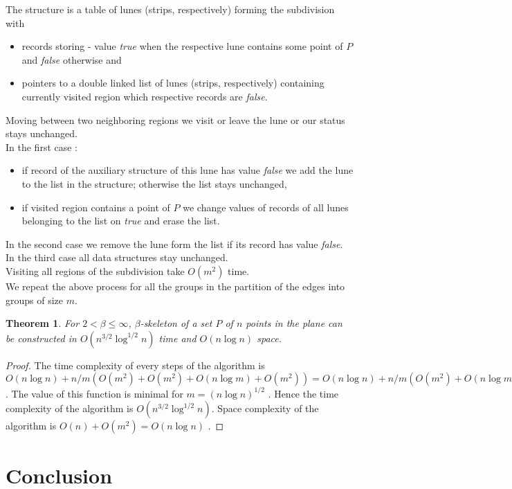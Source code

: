 \documentclass[10pt]{article}
\newtheorem{theorem}{\textbf{Theorem}}[section]
\begin{document}
The structure is a table of lunes (strips, respectively) forming the subdivision with 
\begin{itemize}
\item
records storing - value {\em true} when the respective lune contains some point of $P$ and {\em false} 
otherwise and
\item
pointers to a double linked list of lunes (strips, respectively) containing currently visited region which 
respective records are {\em false}.
\end{itemize}
Moving between two neighboring regions we visit or leave the lune or our status stays unchanged. \\
In the first case : 
\begin{itemize}
\item
if record of the auxiliary structure of this lune has value {\em false} we add the lune to the list 
in the structure; 
otherwise the list stays unchanged, 
\item 
if visited region contains a point of $P$ we change values of records of all lunes belonging to the list 
on {\em true} and erase the list.
\end{itemize}
In the second case we remove the lune form the list if its record has value {\em false}. \\
In the third case all data structures stay unchanged. \\
Visiting all regions of the subdivision take $O(m^2)$ time. \\
We repeat the above process for all the groups in the partition of the edges into
groups of size $m$.

\begin{theorem}
For $2 < \beta \leq \infty$, $\beta$-skeleton of a set $P$ of $n$ points in the plane can be constructed 
in $O(n^{3/2} \log^{1/2} n)$ time and $O(n \log n)$ space.
\end{theorem}
\begin{proof}
The time complexity of every steps of the algorithm is 
$O(n \log n) + n/m(O(m^2) + O(m^2) + O(n \log m) + O(m^2)) =  O(n \log n) + n/m(O(m^2) + O(n \log m))$. 
The value of this function is minimal for $m = (n \log n)^{1/2}$ . Hence the time complexity of the algorithm 
is $O(n^{3/2} \log^{1/2} n)$. Space complexity of the algorithm is $O(n) + O(m^2) = O(n \log n)$ .  
\end{proof}





\section{Conclusion}
\end{document}
